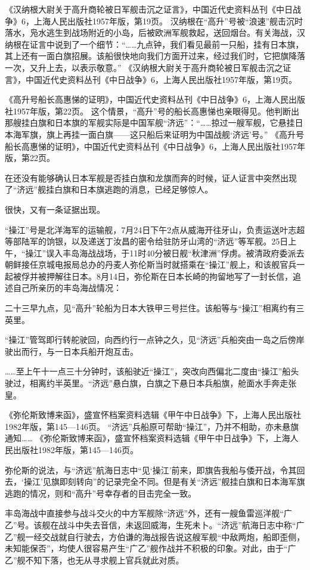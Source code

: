 \documentclass[12pt,UTF8]{ctexbook}
\begin{document}
《汉纳根大尉关于高升商轮被日军舰击沉之证言》，中国近代史资料丛刊《中日战争》6，上海人民出版社1957年版，第19页。
汉纳根在“高升”号被“浪速”舰击沉时落水，凫水逃生到战场附近的小岛，后被欧洲军舰救起，送回烟台。有关海战，汉纳根在证言中说到了一个细节：“……九点钟，我们看见最前一只船，挂有日本旗，其上还有一面白旗招展。该船很快地向我们方面开过来，经过我们时，它把旗降落一次，又升上去，以表示敬意。” 《汉纳根大尉关于高升商轮被日军舰击沉之证言》，中国近代史资料丛刊《中日战争》6，上海人民出版社1957年版，第19页。

《高升号船长高惠悌的证明》，中国近代史资料丛刊《中日战争》6，上海人民出版社1957年版，第22页。
这个情景，“高升”号的船长高惠悌也亲眼得见。他判断出那艘挂白旗和日本旗的军舰实际是中国军舰“济远”：“……掠过一艘军舰，它悬挂日本海军旗，旗上再挂一面白旗——这只船后来证明为中国战舰‘济远’号。” 《高升号船长高惠悌的证明》，中国近代史资料丛刊《中日战争》6，上海人民出版社1957年版，第22页。

在还没有能够确认日本军舰是否挂白旗和龙旗而奔的时候，证人证言中突然出现了“济远”舰挂白旗和日本旗逃跑的消息，已经足够惊人。

很快，又有一条证据出现。

“操江”号是北洋海军的运输舰，7月24日下午2点从威海开往牙山，负责运送叶志超等部陆军的饷银，以及递送丁汝昌的密令给驻防牙山湾的“济远”等军舰。25日上午，“操江”误入丰岛海战战场，于11时40分被日舰“秋津洲”俘虏。被清政府委派去朝鲜接任京城电报局总办的丹麦人弥伦斯当时就搭乘在“操江”舰上，和该舰官兵一起被俘并被押解往日本。8月14日，弥伦斯在日本长崎的拘留地写了一封长信，追述自己所亲历的丰岛海战情况：

二十三早九点，见“高升”轮船为日本大铁甲三号拦住。该船等与“操江”相离约有三英里。

“操江”管驾即行转舵驶回，向西约行一点钟之久，见“济远”兵船突由一岛之后傍岸驶出而行，与一日本兵船开炮互击。

……至上午十一点三十分钟时，该船驶近“操江”，突改向西偏北二度由“操江”船头驶过，相离约半英里。“济远”悬白旗，白旗之下悬日本兵船旗，舱面水手奔走张皇。

《弥伦斯致博来函》，盛宣怀档案资料选辑《甲午中日战争》下，上海人民出版社1982年版，第145—146页。
“济远”兵船原可帮助“操江”，乃并不相助，亦未悬旗通知…… 《弥伦斯致博来函》，盛宣怀档案资料选辑《甲午中日战争》下，上海人民出版社1982年版，第145—146页。

弥伦斯的说法，与“济远”航海日志中“见‘操江’前来，即旗告我船与倭开战，令其回去，‘操江’见旗即刻转向”的记录完全不同。但是有关“济远”舰挂白旗和日本海军旗逃跑的情况，则和“高升”号幸存者的目击完全一致。

丰岛海战中直接参与战斗交火的中方军舰除“济远”外，还有一艘鱼雷巡洋舰“广乙”号。该舰在战斗中失去音信，未返回威海，生死未卜。“济远”航海日志中称“广乙”舰一经交战就自行驶去，方伯谦的海战报告说这艘军舰“中敌两炮，船即歪侧，未知能保否”，均使人很容易产生“广乙”舰作战并不积极的印象。对此，由于“广乙”舰不知下落，也无从寻求舰上官兵就此对质。
\end{document}
